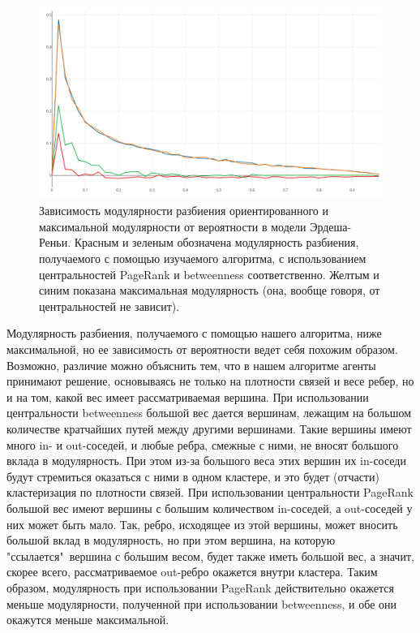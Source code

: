 \begin{figure}[h!]
	\centering
	\includegraphics[width=\textwidth]{pics/greedy_mod.png}
	\caption{Зависимость модулярности разбиения ориентированного и максимальной модулярности от вероятности в модели Эрдеша-Реньи. Красным и зеленым обозначена модулярность разбиения, получаемого с помощью изучаемого алгоритма, с использованием центральностей PageRank и betweenness соответственно. Желтым и синим показана максимальная модулярность (она, вообще говоря, от центральностей не зависит).} 
	\label{fig:greedy_mod}
\end{figure}

Модулярность разбиения, получаемого с помощью нашего алгоритма, ниже максимальной, но ее зависимость от вероятности ведет себя похожим образом. Возможно, различие можно объяснить тем, что в нашем алгоритме агенты принимают решение, основываясь не только на плотности связей и весе ребер, но и на том, какой вес имеет рассматриваемая вершина. При использовании центральности betweenness большой вес дается вершинам, лежащим на большом количестве кратчайших путей между другими вершинами. Такие вершины имеют много in- и out-соседей, и любые ребра, смежные с ними, не вносят большого вклада в модулярность. При этом из-за большого веса этих вершин их in-соседи будут стремиться оказаться с ними в одном кластере, и это будет (отчасти) кластеризация по плотности связей. При использовании центральности PageRank большой вес имеют вершины с большим количеством in-соседей, а out-соседей у них может быть мало. Так, ребро, исходящее из этой вершины, может вносить большой вклад в модулярность, но при этом вершина, на которую "ссылается"\ вершина с большим весом, будет также иметь большой вес, а значит, скорее всего, рассматриваемое out-ребро окажется внутри кластера. Таким образом, модулярность при использовании PageRank действительно окажется меньше модулярности, полученной при использовании betweenness, и обе они окажутся меньше максимальной.